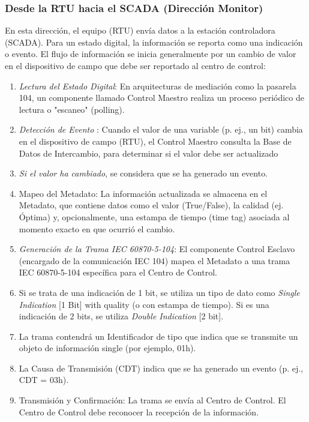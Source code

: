 \documentclass[a5paper]{book}%
\begin{document}
\subsubsection{Desde la RTU hacia el \textbf{SCADA} (Dirección Monitor)}
En esta dirección, el equipo (RTU) envía datos a la estación controladora (SCADA). Para un estado digital, la información se reporta como una indicación o evento. El flujo de información se inicia generalmente por un cambio de valor en el dispositivo de campo que debe ser reportado al centro de control:

\begin{enumerate}
\item \textit{Lectura del Estado Digital}: En arquitecturas de mediación como la pasarela 104, un componente llamado Control Maestro realiza un proceso periódico de lectura o "escaneo" (polling).
\item \textit{Detección de Evento} : Cuando el valor de una variable (p. ej., un bit) cambia en el dispositivo de campo (RTU), el Control Maestro consulta la Base de Datos de Intercambio, para determinar si el valor debe ser actualizado
\item \textit{Si el valor ha cambiado}, se considera que se ha generado un evento.
\item Mapeo del Metadato: La información actualizada se almacena en el Metadato, que contiene datos como el valor (True/False), la calidad (ej. Óptima) y, opcionalmente, una estampa de tiempo (time tag) asociada al momento exacto en que ocurrió el cambio.
\item \textit{Generación de la Trama IEC 60870-5-104}: El componente Control Esclavo (encargado de la comunicación IEC 104) mapea el Metadato a una trama IEC 60870-5-104 específica para el Centro de Control.
\item Si se trata de una indicación de 1 bit, se utiliza un tipo de dato como 	\textit{Single Indication} [1 Bit] with quality (o con estampa de tiempo). Si es una indicación de 2 bits, se utiliza \textit{Double Indication} [2 bit].
\item La trama contendrá un Identificador de tipo que indica que se transmite un objeto de información single (por ejemplo, 01h).
\item La Causa de Transmisión (CDT) indica que se ha generado un evento (p. ej., CDT = 03h).
\item Transmisión y Confirmación: La trama se envía al Centro de Control. El Centro de Control debe reconocer la recepción de la información.
\end{enumerate}
\end{document}
